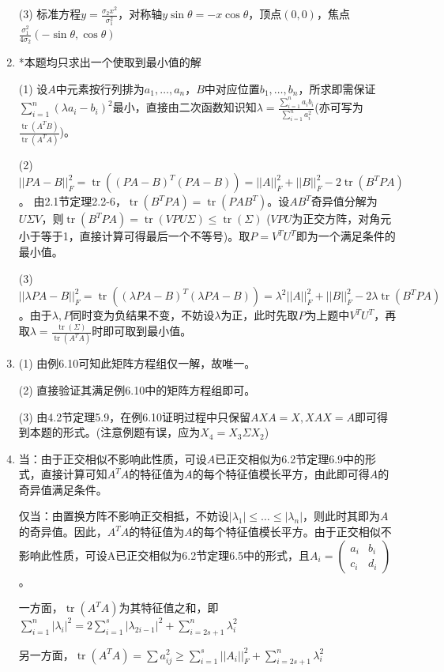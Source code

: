 \documentclass[a4paper,UTF8,fontset=windows]{ctexart}
\DeclareMathOperator{\tr}{tr}
\begin{document}
\begin{enumerate}
(3) 标准方程$y=\frac{\sigma_2 x^2}{\sigma_1^2}$，对称轴$y\sin\theta=-x\cos\theta$，顶点$(0,0)$，焦点$\frac{\sigma_1^2}{4\sigma_2}(-\sin\theta,\cos\theta)$

\item
*本题均只求出一个使取到最小值的解

(1) 设$A$中元素按行列排为$a_1,\dots,a_n$，$B$中对应位置$b_1,\dots,b_n$，所求即需保证$\sum_{i=1}^{n}(\lambda a_i-b_i)^2$最小，直接由二次函数知识知$\lambda=\frac{\sum_{i=1}^{n}{a_ib_i}}{\sum_{i=1}^{n}a_i^2}$(亦可写为$\frac{\tr(A^TB)}{\tr(A^TA)}$)。

(2) $||PA-B||_F^2=\tr((PA-B)^T(PA-B))=||A||_F^2+||B||_F^2-2\tr(B^TPA)$。
由2.1节定理2.2-6，$\tr(B^TPA)=\tr(PAB^T)$。设$AB^T$奇异值分解为$U\Sigma V$，则$\tr(B^TPA)=\tr(VPU\Sigma)\le\tr(\Sigma)$ ($VPU$为正交方阵，对角元小于等于1，直接计算可得最后一个不等号)。取$P=V^TU^T$即为一个满足条件的最小值。

(3) $||\lambda PA-B||_F^2=\tr((\lambda P A-B)^T(\lambda P A-B))=\lambda^2||A||_F^2+||B||_F^2-2\lambda\tr(B^TPA)$。由于$\lambda,P$同时变为负结果不变，不妨设$\lambda$为正，此时先取$P$为上题中$V^TU^T$，再取$\lambda=\frac{\tr(\Sigma)}{\tr(A^TA)}$时即可取到最小值。

\item
(1) 由例6.10可知此矩阵方程组仅一解，故唯一。

(2) 直接验证其满足例6.10中的矩阵方程组即可。

(3) 由4.2节定理5.9，在例6.10证明过程中只保留$AXA=X,XAX=A$即可得到本题的形式。(注意例题有误，应为$X_4=X_3\Sigma X_2$)

\item
当：由于正交相似不影响此性质，可设$A$已正交相似为6.2节定理6.9中的形式，直接计算可知$A^TA$的特征值为$A$的每个特征值模长平方，由此即可得$A$的奇异值满足条件。

仅当：由置换方阵不影响正交相抵，不妨设$|\lambda_1|\le\dots\le|\lambda_n|$，则此时其即为$A$的奇异值。因此，$A^TA$的特征值为$A$的每个特征值模长平方。由于正交相似不影响此性质，可设A已正交相似为6.2节定理6.5中的形式，且$A_i=\begin{pmatrix}a_i&b_i\\c_i&d_i\end{pmatrix}$。

一方面，$\tr(A^TA)$为其特征值之和，即$\sum_{i=1}^{n}{|\lambda_i|^2}=2\sum_{i=1}^{s}{|\lambda_{2i-1}}|^2+\sum_{i=2s+1}^{n}\lambda_i^2$

另一方面，$\tr\left(A^TA\right)=\sum a_{ij}^2\ge\sum_{i=1}^{s}{||A_i}||_F^2+\sum_{i=2s+1}^{n}\lambda_i^2$


\end{enumerate}
\end{document}
